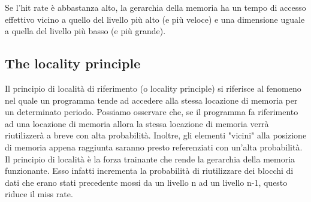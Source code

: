 \begin{observation}
Se l'hit rate è abbastanza alto, la gerarchia della memoria ha un tempo di accesso effettivo vicino a quello del livello più alto (e più veloce) e una dimensione uguale a quella del livello più basso (e più grande).
\end{observation}

\subsection{The locality principle}
Il principio di località di riferimento (o locality principle) si riferisce al fenomeno nel quale un programma tende ad accedere alla stessa locazione di memoria per un determinato periodo. Possiamo osservare che, se il programma fa riferimento ad una locazione di memoria allora la stessa locazione di memoria verrà riutilizzerà a breve con alta probabilità. Inoltre, gli elementi "vicini" alla posizione di memoria appena raggiunta saranno presto referenziati con un'alta probabilità. \\

Il principio di località è la forza trainante che rende la gerarchia della memoria funzionante. Esso infatti incrementa la probabilità di riutilizzare dei blocchi di dati che erano stati precedente mossi da un livello n ad un livello n-1, questo riduce il miss rate.


